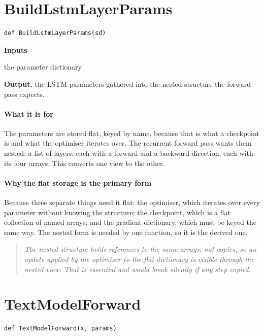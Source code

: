 \section{BuildLstmLayerParams}
\begin{lstlisting}[style=sig]
def BuildLstmLayerParams(sd)
\end{lstlisting}

\noindent\textbf{Inputs}
\begin{description}[leftmargin=2.2em,style=nextline,font=\normalfont\ttfamily]\setlength\itemsep{1pt}
  \item[{sd}] \normalfont the parameter dictionary
\end{description}

\noindent\textbf{Output.} the LSTM parameters gathered into the nested structure the forward pass expects.


\paragraph{What it is for}
The parameters are stored flat, keyed by name, because that is what a checkpoint is and what the optimiser iterates over. The recurrent forward pass wants them nested: a list of layers, each with a forward and a backward direction, each with its four arrays. This converts one view to the other.


\paragraph{Why the flat storage is the primary form}
Because three separate things need it flat: the optimiser, which iterates over every parameter without knowing the structure; the checkpoint, which is a flat collection of named arrays; and the gradient dictionary, which must be keyed the same way. The nested form is needed by one function, so it is the derived one.


\begin{quote}\small\itshape The nested structure holds references to the same arrays, not copies, so an update applied by the optimiser to the flat dictionary is visible through the nested view. That is essential and would break silently if any step copied.\end{quote}

\section{TextModelForward}
\begin{lstlisting}[style=sig]
def TextModelForward(x, params)
\end{lstlisting}

